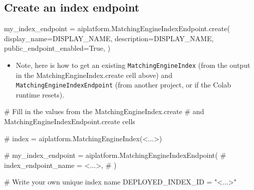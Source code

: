 \documentclass[
  letterpaper,
  DIV=11,
  numbers=noendperiod]{scrreprt}
\newenvironment{Shaded}{\begin{snugshade}}{\end{snugshade}}
\newcommand{\CommentTok}[1]{\textcolor[rgb]{0.37,0.37,0.37}{#1}}
\newcommand{\NormalTok}[1]{\textcolor[rgb]{0.00,0.23,0.31}{#1}}
\newcommand{\OperatorTok}[1]{\textcolor[rgb]{0.37,0.37,0.37}{#1}}
\newcommand{\StringTok}[1]{\textcolor[rgb]{0.13,0.47,0.30}{#1}}
\newcommand{\VariableTok}[1]{\textcolor[rgb]{0.07,0.07,0.07}{#1}}
\providecommand{\tightlist}{%
  \setlength{\itemsep}{0pt}\setlength{\parskip}{0pt}}\usepackage{longtable,booktabs,array}
\begin{document}
\hypertarget{create-an-index-endpoint}{%
\subsection{Create an index endpoint}\label{create-an-index-endpoint}}

\begin{Shaded}
\begin{Highlighting}[]
\NormalTok{my\_index\_endpoint }\OperatorTok{=}\NormalTok{ aiplatform.MatchingEngineIndexEndpoint.create(}
\NormalTok{    display\_name}\OperatorTok{=}\NormalTok{DISPLAY\_NAME,}
\NormalTok{    description}\OperatorTok{=}\NormalTok{DISPLAY\_NAME,}
\NormalTok{    public\_endpoint\_enabled}\OperatorTok{=}\VariableTok{True}\NormalTok{,}
\NormalTok{)}
\end{Highlighting}
\end{Shaded}

\begin{itemize}
\tightlist
\item
  Note, here is how to get an existing \texttt{MatchingEngineIndex}
  (from the output in the MatchingEngineIndex.create cell above) and
  \texttt{MatchingEngineIndexEndpoint} (from another project, or if the
  Colab runtime resets).
\end{itemize}

\begin{Shaded}
\begin{Highlighting}[]
\CommentTok{\# Fill in the values from the MatchingEngineIndex.create}
\CommentTok{\# and MatchingEngineIndexEndpoint.create cells}

\CommentTok{\# index = aiplatform.MatchingEngineIndex(\textquotesingle{}\textless{}...\textgreater{}\textquotesingle{})}

\CommentTok{\# my\_index\_endpoint = aiplatform.MatchingEngineIndexEndpoint(}
\CommentTok{\#     index\_endpoint\_name = \textquotesingle{}\textless{}...\textgreater{}\textquotesingle{},}
\CommentTok{\# )}

\end{Highlighting}
\end{Shaded}

\begin{Shaded}
\begin{Highlighting}[]
\CommentTok{\# Write your own unique index name}
\NormalTok{DEPLOYED\_INDEX\_ID }\OperatorTok{=} \StringTok{"\textless{}...\textgreater{}"}
\end{Highlighting}
\end{Shaded}
\end{document}
